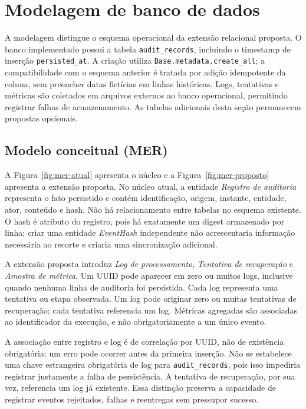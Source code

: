 \section{Modelagem de banco de dados}
\label{sec:banco}
A modelagem distingue o esquema operacional da extensão relacional proposta. O banco implementado possui a tabela \texttt{audit\_records}, incluindo o timestamp de inserção \texttt{persisted\_at}. A criação utiliza \texttt{Base.metadata.create\_all}; a compatibilidade com o esquema anterior é tratada por adição idempotente da coluna, sem preencher datas fictícias em linhas históricas. Logs, tentativas e métricas são coletados em arquivos externos ao banco operacional, permitindo registrar falhas de armazenamento. As tabelas adicionais desta seção permanecem propostas opcionais.

\subsection{Modelo conceitual (MER)}
A Figura~\ref{fig:mer-atual} apresenta o núcleo e a Figura~\ref{fig:mer-proposto} apresenta a extensão proposta. No núcleo atual, a entidade \textit{Registro de auditoria} representa o fato persistido e contém identificação, origem, instante, entidade, ator, conteúdo e hash. Não há relacionamento entre tabelas no esquema existente. O hash é atributo do registro, pois há exatamente um digest armazenado por linha; criar uma entidade \textit{EventHash} independente não acrescentaria informação necessária ao recorte e criaria uma sincronização adicional.

A extensão proposta introduz \textit{Log de processamento}, \textit{Tentativa de recuperação} e \textit{Amostra de métrica}. Um UUID pode aparecer em zero ou muitos logs, inclusive quando nenhuma linha de auditoria foi persistida. Cada log representa uma tentativa ou etapa observada. Um log pode originar zero ou muitas tentativas de recuperação; cada tentativa referencia um log. Métricas agregadas são associadas ao identificador da execução, e não obrigatoriamente a um único evento.


A associação entre registro e log é de correlação por UUID, não de existência obrigatória: um erro pode ocorrer antes da primeira inserção. Não se estabelece uma chave estrangeira obrigatória de log para \texttt{audit\_records}, pois isso impediria registrar justamente a falha de persistência. A tentativa de recuperação, por sua vez, referencia um log já existente. Essa distinção preserva a capacidade de registrar eventos rejeitados, falhas e reentregas sem pressupor sucesso.

